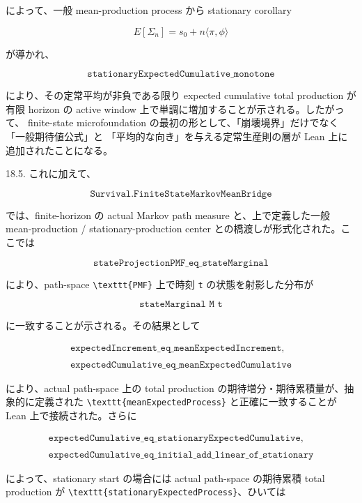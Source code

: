\documentclass[12pt,a4paper]{article}
\begin{document}
によって、一般 mean-production process から stationary corollary

\[
E[\Sigma_{n}] = s_0 + n\langle \pi,\phi\rangle
\]

が導かれ、

\[
\texttt{stationaryExpectedCumulative\_monotone}
\]

により、その定常平均が非負である限り expected cumulative total production が 有限 horizon の active window 上で単調に増加することが示される。したがって、 finite-state microfoundation の最初の形として、「崩壊境界」だけでなく「一般期待値公式」と 「平均的な向き」を与える定常生産則の層が Lean 上に追加されたことになる。

18.5. これに加えて、

\[
\texttt{Survival.FiniteStateMarkovMeanBridge}
\]

では、finite-horizon の actual Markov path measure と、上で定義した一般 mean-production / stationary-production center との橋渡しが形式化された。ここでは

\[
\texttt{stateProjectionPMF\_eq\_stateMarginal}
\]

により、path-space \texttt{\textbackslash{}texttt\{PMF\}} 上で時刻 \texttt{t} の状態を射影した分布が

\[
\texttt{stateMarginal M t}
\]

に一致することが示される。その結果として

\[
\begin{aligned}
\texttt{expectedIncrement\_eq\_meanExpectedIncrement}, \\
\qquad \\
\texttt{expectedCumulative\_eq\_meanExpectedCumulative}
\end{aligned}
\]

により、actual path-space 上の total production の期待増分・期待累積量が、抽象的に定義された \texttt{\textbackslash{}texttt\{meanExpectedProcess\}} と正確に一致することが Lean 上で接続された。さらに

\[
\begin{aligned}
\texttt{expectedCumulative\_eq\_stationaryExpectedCumulative}, \\
\qquad \\
\texttt{expectedCumulative\_eq\_initial\_add\_linear\_of\_stationary}
\end{aligned}
\]

によって、stationary start の場合には actual path-space の期待累積 total production が \texttt{\textbackslash{}texttt\{stationaryExpectedProcess\}}、ひいては
\end{document}
